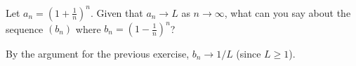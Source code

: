 \documentclass[11pt,dvipsnames]{book}
\numberwithin{equation}{section} %
\numberwithin{figure}{section} %
\numberwithin{table}{section} %
\begin{document}
\begin{exercise}
Let $a_n = \left( 1+ \frac{1}{n}\right)^n$. Given that $a_n \to L$ as $n \to \infty$, what can you say about
the sequence $(b_n)$ where
$b_n = \left( 1- \frac{1}{n}\right)^n$?
\begin{solution}
By the argument for the previous exercise, $b_n \to 1/L$ (since $L \geq 1$). 
\end{solution}
\end{exercise}


%
%
\end{document}
